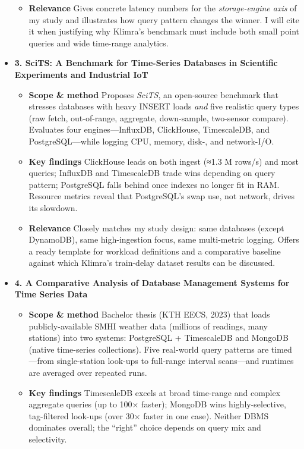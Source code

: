 \documentclass[11pt]{article}
\begin{document}
\begin{itemize}
\begin{itemize}
       \item[] \textbf{Relevance} Gives concrete latency numbers for the \textit{storage-engine axis} of my study and illustrates how query pattern changes the winner. I will cite it when justifying why Klimra's benchmark must include both small point queries and wide time-range analytics.
    \end{itemize}
    \newpage
    \item[] \textbf{3. SciTS: A Benchmark for Time-Series Databases in Scientific Experiments and Industrial IoT}
    \begin{itemize}
       \item[] \textbf{Scope \& method}  Proposes \emph{SciTS}, an open-source benchmark that stresses databases with heavy INSERT loads \textit{and} five realistic query types (raw fetch, out-of-range, aggregate, down-sample, two-sensor compare).  Evaluates four engines—InfluxDB, ClickHouse, TimescaleDB, and PostgreSQL—while logging CPU, memory, disk-, and network-I/O.
      
       \item[] \textbf{Key findings}  ClickHouse leads on both ingest (≈1.3 M rows/s) and most queries; InfluxDB and TimescaleDB trade wins depending on query pattern; PostgreSQL falls behind once indexes no longer fit in RAM.  Resource metrics reveal that PostgreSQL’s swap use, not network, drives its slowdown.
      
       \item[] \textbf{Relevance}  Closely matches my study design: same databases (except DynamoDB), same high-ingestion focus, same multi-metric logging.  Offers a ready template for workload definitions and a comparative baseline against which Klimra's train-delay dataset results can be discussed.
  \end{itemize}
    \item[] \textbf{4. A Comparative Analysis of Database Management Systems for Time Series Data}
    \begin{itemize}
      \item[] \textbf{Scope \& method}  Bachelor thesis (KTH EECS, 2023) that loads publicly-available SMHI weather data (millions of readings, many stations) into two systems: PostgreSQL + TimescaleDB and MongoDB (native time-series collections).  
      Five real-world query patterns are timed—from single-station look-ups to full-range interval scans—and runtimes are averaged over repeated runs.
      
      \item[] \textbf{Key findings}  TimescaleDB excels at broad time-range and complex aggregate queries (up to 100× faster); MongoDB wins highly-selective, tag-filtered look-ups (over 30× faster in one case).  Neither DBMS dominates overall; the “right” choice depends on query mix and selectivity.
      

\end{itemize}
\end{itemize}
\end{document}

